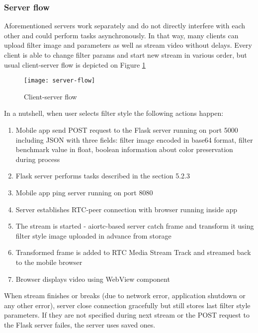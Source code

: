 \documentclass[../Main.tex]{subfiles}
\begin{document}
    \subsubsection{Server flow}
    Aforementioned servers work separately and do not directly interfere with each other and could perform tasks asynchronously. In that way, many clients can upload filter image and parameters as well as stream video without delays. Every client is able to change filter params and start new stream in various order, but usual client-server flow is depicted on Figure \ref{fig:server-flow} \\
    \begin{figure}[h]
    \centering
    \texttt{[image: server-flow]}
    \caption{Client-server flow}
        \label{fig:server-flow}
    \end{figure}
    
    In a nutshell, when user selects filter style the following actions happen:
    \begin{enumerate}
    \item Mobile app send POST request to the Flask server running on port 5000 including JSON with three fields: filter image encoded in base64 format, filter benchmark value in float, boolean information about color preservation during process 
    \item Flask server performs tasks described in the section 5.2.3
    \item Mobile app ping server running on port 8080
    \item Server establishes RTC-peer connection with browser running inside app
    \item The stream is started - aiortc-based server catch frame and transform it using filter style image uploaded in advance from storage
    \item Transformed frame is added to RTC Media Stream Track and streamed back to the mobile browser
    \item Browser displays video using WebView component 
    \end{enumerate}
    
    When stream finishes or breaks (due to network error, application shutdown or any other error), server close connection gracefully but still stores last filter style parameters. If they are not specified during next stream or the POST request to the Flask server failes, the server uses saved ones. 
    
\end{document}

